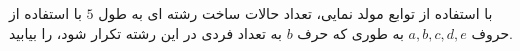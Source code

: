 \exercise
با استفاده از توابع مولد نمایی، تعداد حالات ساخت رشته ای به طول 
$5$
با استفاده از حروف 
$a, b, c, d, e$
 به طوری که حرف 
$b$
  به تعداد فردی در این رشته تکرار شود، را بیابید.